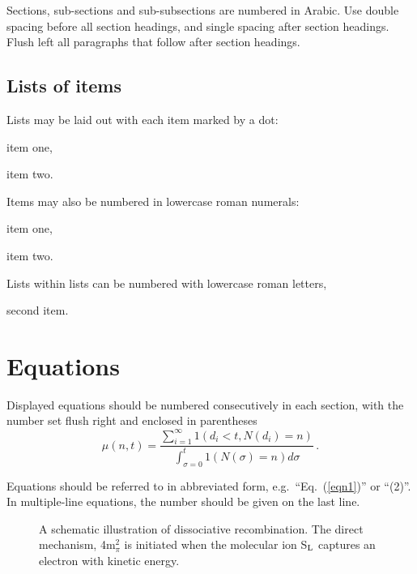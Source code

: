 \documentclass{ws-ijmpd}
\begin{document}
Sections, sub-sections and sub-subsections are numbered in
Arabic.  Use double spacing before all section headings, and
single spacing after section headings. Flush left all paragraphs
that follow after section headings.

\subsection{Lists of items}

Lists may be laid out with each item marked by a dot:
\begin{itemlist}
 \item item one,
 \item item two.
\end{itemlist}
Items may also be numbered in lowercase roman numerals:
\begin{romanlist}[(ii)]
\item item one,
\item item two.
\begin{romanlist}[(b)]
\item Lists within lists can be numbered with lowercase roman letters,
\item second item.
\end{romanlist}
\end{romanlist}

\section{Equations}

Displayed equations should be numbered consecutively in each section,
with the number set flush right and enclosed in parentheses
\begin{equation}
\mu(n, t) = \frac{\sum^\infty_{i=1} 1(d_i < t, N(d_i)
= n)}{\int^t_{\sigma=0} 1(N(\sigma) = n)d\sigma}\,.
\label{eqn1}
\end{equation}

Equations should be referred to in abbreviated form,
e.g.~``Eq.~(\ref{eqn1})'' or ``(2)''. In multiple-line
equations, the number should be given on the last line.

\begin{figure}[pb]
\centerline{}
\vspace*{8pt}
\caption{A schematic illustration of dissociative recombination. The
direct mechanism, 4m$^2_\pi$ is initiated when the
molecular ion S$_{\rm L}$ captures an electron with
kinetic energy. \label{f1}}
\end{figure}
\end{document}
